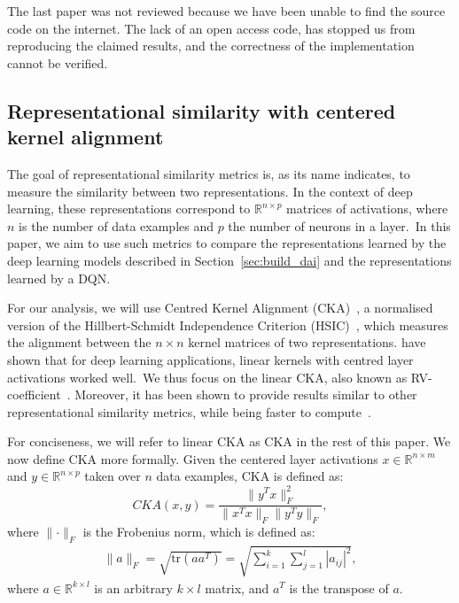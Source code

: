 \documentclass[twoside,11pt]{article}
\begin{document}
The last paper \citep{schneider2022active} was not reviewed because we have been unable to find the source code on the internet. The lack of an open access code, has stopped us from reproducing the claimed results, and the correctness of the implementation cannot be verified.

\subsection{Representational similarity with centered kernel alignment}\label{ssec:similarity}
The goal of representational similarity metrics is, as its name indicates, to measure the similarity between two representations.
In the context of deep learning, these representations correspond to $\mathbb{R}^{n \times p}$ matrices of activations, where
$n$ is the number of data examples and $p$ the number of neurons in a layer.~In this paper, we aim to use such metrics to compare the representations learned by the deep learning models described in Section~\ref{sec:build_dai} and the
representations learned by a DQN.

For our analysis, we will use Centred Kernel Alignment (CKA)~\citep{Cortes2012,Cristianini2002}, a normalised version of the Hillbert-Schmidt Independence Criterion (HSIC)~\citep{Gretton2005}, which measures the alignment between the $n \times n$ kernel matrices of two representations. \citet{Kornblith2019} have shown that for deep learning applications, linear kernels with centred layer activations worked well.~We thus focus on the linear CKA, also known as RV-coefficient~\citep{Robert1976}. Moreover, it has been shown to provide results similar to other representational similarity metrics, while being faster to compute~\citep{Bonheme2022}.

For conciseness, we will refer to linear CKA as CKA in the rest of this paper.
We now define CKA more formally. Given the centered layer activations $x \in \mathbb{R}^{n \times m}$ and $y \in \mathbb{R}^{n \times p}$ taken over $n$ data examples, CKA is defined as:
\begin{equation*}
    CKA(x, y) = \frac{\lVert y^Tx \rVert_F^2}{\lVert x^Tx \rVert_F\lVert y^Ty \rVert_F},
\end{equation*}
where $\lVert{\cdot}\rVert_F$ is the Frobenius norm, which is defined as:
\begin{align*}
\lVert{a}\rVert_F = \sqrt{\text{tr}(aa^T)} = \sqrt{\sum_{i=1}^k\sum_{j=1}^l |a_{ij}|^2},
\end{align*}
where $a \in \mathbb{R}^{k\times l}$ is an arbitrary $k \times l$ matrix, and $a^T$ is the transpose of $a$.
\end{document}
